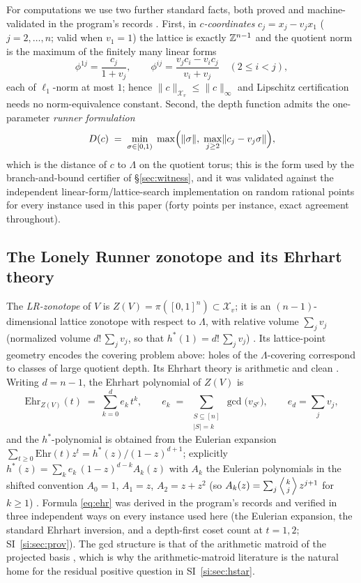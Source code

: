 For computations we use two further standard facts, both proved and
machine-validated in the program's records \cite{prog-artifacts}. First,
in \emph{$c$-coordinates} $c_j=x_j-v_jx_1$ ($j=2,\dots,n$; valid when
$v_1=1$) the lattice is exactly $\mathbb{Z}^{n-1}$ and the quotient norm is the
maximum of the finitely many linear forms
\[
\phi^{1j}=\frac{c_j}{1+v_j},\qquad
\phi^{ij}=\frac{v_jc_i-v_ic_j}{v_i+v_j}\quad(2\le i<j),
\]
each of $\ell_1$-norm at most $1$; hence
$\|c\|_{\mathcal{X}_v}\le\|c\|_\infty$ and Lipschitz certification
needs no norm-equivalence constant. Second, the depth function admits the
one-parameter \emph{runner formulation}
\begin{equation}\label{eq:runnerform}
D(c)\;=\;\min_{\sigma\in[0,1)}\;\max\Bigl(\lVert \sigma \rVert,\;
\max_{j\ge 2}\lVert c_j-v_j\sigma \rVert\Bigr),
\end{equation}
which is the distance of $c$ to $\Lambda$ on the quotient torus; this is
the form used by the branch-and-bound certifier of \S\ref{sec:witness},
and it was validated against the independent linear-form/lattice-search
implementation on random rational points for every instance used in this
paper (forty points per instance, exact agreement throughout).

\subsection{The Lonely Runner zonotope and its Ehrhart theory}

The \emph{LR-zonotope} of $V$ is $Z(V)=\pi([0,1]^n)\subset
\mathcal{X}_v$; it is an $(n{-}1)$-dimensional lattice zonotope with
respect to $\Lambda$, with relative volume $\sum_j v_j$ (normalized
volume $d!\,\sum_j v_j$, so that $h^*(1)=d!\,\sum_j v_j$)
\cite{Shephard,BeckRobins}. Its lattice-point geometry encodes the
covering problem above: holes of the $\Lambda$-covering correspond to
classes of large quotient depth. Its Ehrhart theory is arithmetic and
clean \cite{BeckRobins,dAMoci,StanleyEC}. Writing $d=n-1$, the Ehrhart
polynomial of $Z(V)$ is
\begin{equation}\label{eq:ehr}
\mathrm{Ehr}_{Z(V)}(t)\;=\;\sum_{k=0}^{d} e_k\,t^k,\qquad
e_k\;=\;\sum_{\substack{S\subseteq[n]\\|S|=k}}\gcd\!\bigl(v_{S^c}\bigr),
\qquad e_d=\sum_j v_j,
\end{equation}
and the $h^*$-polynomial is obtained
from the Eulerian expansion
$\sum_{t\ge0}\mathrm{Ehr}(t)z^t=h^*(z)/(1-z)^{d+1}$; explicitly
$h^*(z)=\sum_k e_k\,(1-z)^{d-k}A_k(z)$ with $A_k$ the Eulerian
polynomials in the shifted convention $A_0=1$, $A_1=z$, $A_2=z+z^2$
(so $A_k(z)=\sum_{j}\left\langle{k\atop j}\right\rangle z^{j+1}$ for
$k\ge1$) \cite{Frobenius}. Formula \eqref{eq:ehr} was derived in the
program's records and verified in three independent ways on every
instance used here (the Eulerian expansion, the standard Ehrhart
inversion, and a depth-first coset count at $t=1,2$;
SI~\ref{si:sec:prov}). The gcd structure is that of the arithmetic
matroid of the projected basis \cite{dAMoci}, which is why the
arithmetic-matroid literature is the natural home for the residual
positive question in SI~\ref{si:sec:hstar}.

